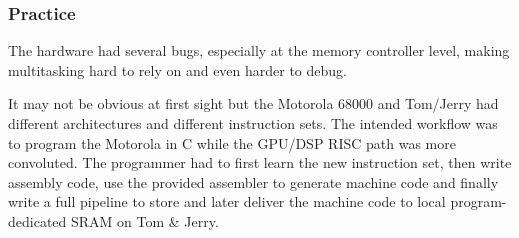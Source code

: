 \subsubsection{Practice}
The hardware had several bugs, especially at the memory controller level, making multitasking hard to rely on and even harder to debug.







It may not be obvious at first sight but the Motorola 68000 and Tom/Jerry had different architectures and different instruction sets. The intended workflow was to program the Motorola in C while the GPU/DSP RISC path was more convoluted. The programmer had to first learn the new instruction set, then write assembly code, use the provided assembler to generate machine code and finally write a full pipeline to store and later deliver the machine code to local program-dedicated SRAM on Tom \& Jerry.\\
\par











